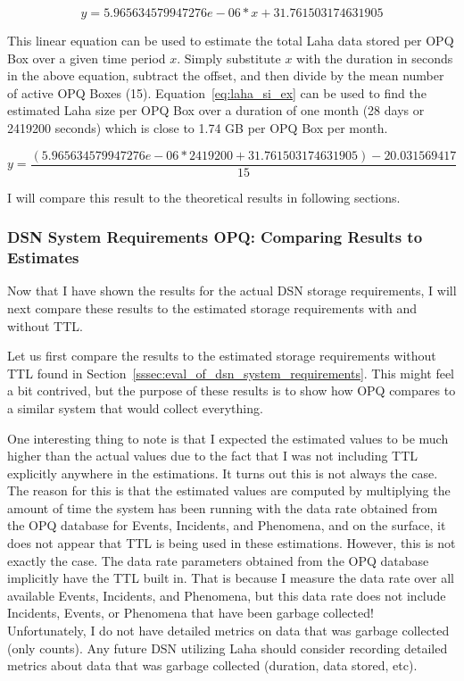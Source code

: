 \begin{equation}
    y = 5.965634579947276e-06 * x + 31.761503174631905
    \label{eq:laha_si}
\end{equation}

This linear equation can be used to estimate the total Laha data stored per OPQ Box over a given time period $x$. Simply substitute $x$ with the duration in seconds in the above equation, subtract the offset, and then divide by the mean number of active OPQ Boxes (15). Equation~\ref{eq:laha_si_ex} can be used to find the estimated Laha size per OPQ Box over a duration of one month (28 days or 2419200 seconds) which is close to 1.74 GB per OPQ Box per month.

\begin{equation}
    y = \frac{(5.965634579947276e-06 * 2419200 + 31.761503174631905) - 20.031569417}{15}
    \label{eq:laha_si_ex}
\end{equation}

I will compare this result to the theoretical results in following sections.

\subsubsection{DSN System Requirements OPQ: Comparing Results to Estimates}

Now that I have shown the results for the actual DSN storage requirements, I will next compare these results to the estimated storage requirements with and without TTL\@.

Let us first compare the results to the estimated storage requirements without TTL found in Section~\ref{sssec:eval_of_dsn_system_requirements}. This might feel a bit contrived, but the purpose of these results is to show how OPQ compares to a similar system that would collect everything.

One interesting thing to note is that I expected the estimated values to be much higher than the actual values due to the fact that I was not including TTL explicitly anywhere in the estimations. It turns out this is not always the case. The reason for this is that the estimated values are computed by multiplying the amount of time the system has been running with the data rate obtained from the OPQ database for Events, Incidents, and Phenomena, and on the surface, it does not appear that TTL is being used in these estimations. However, this is not exactly the case. The data rate parameters obtained from the OPQ database implicitly have the TTL built in. That is because I measure the data rate over all available Events, Incidents, and Phenomena, but this data rate does not include Incidents, Events, or Phenomena that have been garbage collected! Unfortunately, I do not have detailed metrics on data that was garbage collected (only counts). Any future DSN utilizing Laha should consider recording detailed metrics about data that was garbage collected (duration, data stored, etc).

